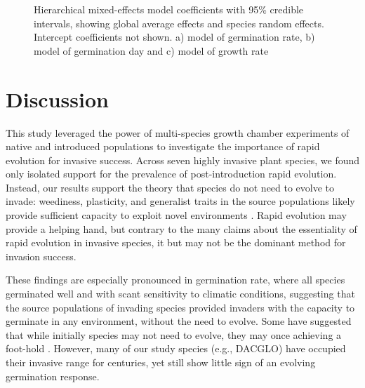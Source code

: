 \documentclass[12pt]{article}\usepackage[]{graphicx}\usepackage[]{color}
\begin{document}
\begin{figure}
	\caption{Hierarchical mixed-effects model coefficients with 95\% credible intervals, showing global average effects and species random effects. Intercept coefficients not shown.  a) model of germination rate, b) model of germination day and c) model of growth rate}
	\label{fig:coef}
\end{figure}

	\section{Discussion} 
	
	This study leveraged the power of multi-species growth chamber experiments of native and introduced populations to investigate the importance of rapid evolution for invasive success. Across seven highly invasive plant species, we found only isolated support for the prevalence of post-introduction rapid evolution. Instead, our results support the theory that species do not need to evolve to invade: weediness, plasticity, and generalist traits in the source populations likely provide sufficient capacity to exploit novel environments \parencite{Baker1965}. Rapid evolution may provide a helping hand, but contrary to the many claims about the essentiality of rapid evolution in invasive species, it but may not be the dominant method for invasion success.  
	
	These findings are  especially pronounced in germination rate, where all species germinated well and with scant sensitivity to climatic conditions, suggesting that the source populations of invading species provided invaders with the capacity to germinate in any environment, without the need to evolve. Some have suggested that while initially species may not need to evolve, they may once achieving a foot-hold \parencite{Lamarque2015}. However, many of our study species (e.g., DACGLO) have occupied their invasive range for centuries, yet still show little sign of an evolving germination response. 
	
\end{document}
